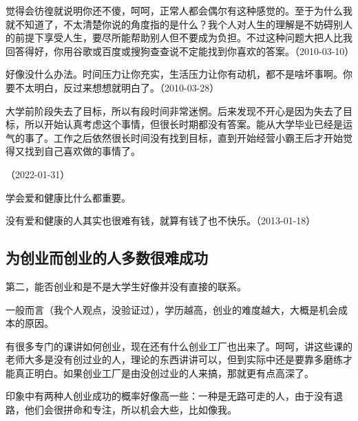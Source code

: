 
觉得会彷徨就说明你还不傻，呵呵，正常人都会偶尔有这种感觉的。至于为什么我就不知道了，不太清楚你说的角度指的是什么？我个人对人生的理解是不妨碍别人的前提下享受人生，要尽所能帮助别人但不要成为负担。不过这种问题大把人比我回答得好，你用谷歌或百度或搜狗查查说不定能找到你喜欢的答案。（2010-03-10）


好像没什么办法。时间压力让你充实，生活压力让你有动机，都不是啥坏事啊。你要不太明白，反过来想想就明白了。（2010-03-28）


大学前阶段失去了目标，所以有段时间非常迷惘。后来发现不开心是因为失去了目标，所以开始认真考虑这个事情，但很长时期都没有答案。能从大学毕业已经是运气的事了。工作之后依然很长时间没有找到目标，直到开始经营小霸王后才开始觉得又找到自己喜欢做的事情了。

（2022-01-31）


学会爱和健康比什么都重要。


没有爱和健康的人其实也很难有钱，就算有钱了也不快乐。（2013-01-18）

\subsection{为创业而创业的人多数很难成功}


第二，能否创业和是不是大学生好像并没有直接的联系。

一般而言（我个人观点，没验证过），学历越高，创业的难度越大，大概是机会成本的原因。

有很多专门的课讲如何创业，现在还有什么创业工厂也出来了。呵呵，讲这些课的老师大多是没有创过业的人，理论的东西讲讲可以，但到实际中还是要靠多磨练才能真正明白。如果创业工厂是由没创过业的人来搞，那就更有点高深了。

印象中有两种人创业成功的概率好像高一些：一种是无路可走的人，由于没有退路，他们会很拼命和专注，所以机会大些，比如像我。

